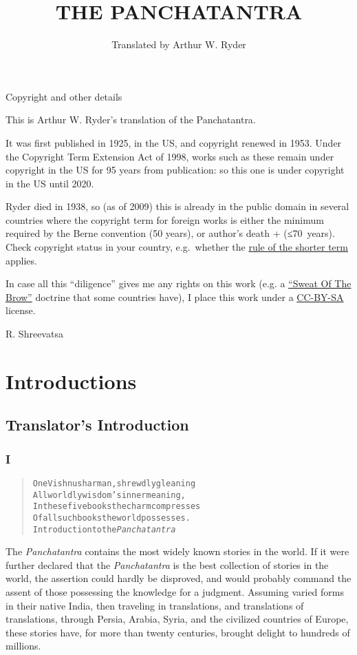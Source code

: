 \documentclass[article, twoside, 10pt]{memoir}
\title{THE PANCHATANTRA}
\author{Translated by Arthur W. Ryder}
\renewenvironment{verbatim}{%
\begin{quote}%
\vskip -10pt%
\begin{alltt}\normalfont\small}{\end{alltt}%
\end{quote}%
\vskip -10pt
} %
\begin{document}
\maketitle

\tableofcontents

Copyright and other details

This is Arthur W. Ryder's translation of the Panchatantra.

It was first published in 1925, in the US, and copyright renewed in
1953. Under the Copyright Term Extension Act of 1998, works such as
these remain under copyright in the US for 95 years from
publication: so this one is under copyright in the US until 2020.

Ryder died in 1938, so (as of 2009) this is already in the public
domain in several countries where the copyright term for foreign
works is either the minimum required by the Berne convention (50
years), or author's death + (≤70~years). Check copyright status in
your country, e.g.~whether the
\href{http://en.wikipedia.org/wiki/Rule_of_the_shorter_term}{rule of the shorter term}
applies.

In case all this ``diligence'' gives me any rights on this work
(e.g. a
\href{http://www.gutenberg.org/wiki/Gutenberg:No_Sweat_of_the_Brow_Copyright}{``Sweat Of The Brow''}
doctrine that some countries have), I place this work under a
\href{http://creativecommons.org/licenses/by-sa/3.0/}{CC-BY-SA}
license.

{\textemdash}R. Shreevatsa

\part{Introductions}

\chapter{Translator's Introduction}

\section{I}

\begin{verbatim}
One Vishnusharman, shrewdly gleaning
All worldly wisdom's inner meaning,
In these five books the charm compresses
Of all such books the world possesses.
        {\textemdash}Introduction to the \emph{Panchatantra}
\end{verbatim}
The \emph{Panchatantra} contains the most widely known stories in
the world. If it were further declared that the \emph{Panchatantra}
is the best collection of stories in the world, the assertion could
hardly be disproved, and would probably command the assent of those
possessing the knowledge for a judgment. Assuming varied forms in
their native India, then traveling in translations, and
translations of translations, through Persia, Arabia, Syria, and
the civilized countries of Europe, these stories have, for more
than twenty centuries, brought delight to hundreds of millions.
\end{document}
